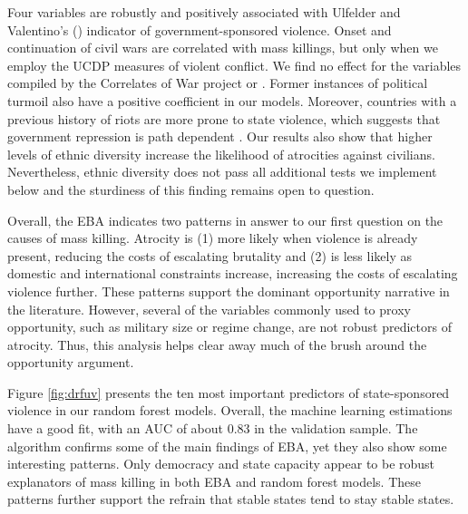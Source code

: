 \documentclass[a4paper,12pt]{article}
\begin{document}
Four variables are robustly and positively associated with Ulfelder and Valentino's (\citeyear{ulfelder2008assessing}) indicator of government-sponsored violence. Onset and continuation of civil wars are correlated with mass killings, but only when we employ the UCDP measures of violent conflict. We find no effect for the variables compiled by the Correlates of War project or \cite{cederman2010ethnic}. Former instances of political turmoil also have a positive coefficient in our models. Moreover, countries with a previous history of riots are more prone to state violence, which suggests that government repression is path dependent \citep[e.g.,][]{gurr2000peoples,harff2003no,krain1997state,nyseth2017re}. Our results also show that higher levels of ethnic diversity increase the likelihood of atrocities against civilians. Nevertheless, ethnic diversity does not pass all additional tests we implement below and the sturdiness of this finding remains open to question.

Overall, the EBA indicates two patterns in answer to our first question on the causes of mass killing. Atrocity is (1) more likely when violence is already present, reducing the costs of escalating brutality and (2) is less likely as domestic and international constraints increase, increasing the costs of escalating violence further. These patterns support the dominant opportunity narrative in the literature. However, several of the variables commonly used to proxy opportunity, such as military size or regime change, are not robust predictors of atrocity. Thus, this analysis helps clear away much of the brush around the opportunity argument.

Figure \ref{fig:drfuv} presents the ten most important predictors of state-sponsored violence in our random forest models. Overall, the machine learning estimations have a good fit, with an AUC of about 0.83 in the validation sample. The algorithm confirms some of the main findings of EBA, yet they also show some interesting patterns. Only democracy and state capacity appear to be robust explanators of mass killing in both EBA and random forest models. These patterns further support the refrain that stable states tend to stay stable states. 
\end{document}
